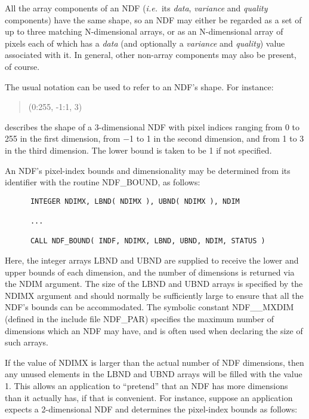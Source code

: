 \documentclass[twoside,11pt]{article}
\newcommand{\htmlref}[2]{#1}
\newcommand{\st}[1]{{\em{#1}}}
\begin{document}
All the array components of an NDF (\st{i.e.}\ its \st{data}, \st{variance\/} and
\st{quality\/} components) have the same shape, so an NDF may either be
regarded as a set of up to three matching N-dimensional arrays, or as an
N-dimensional array of pixels each of which has a \st{data\/} (and optionally
a \st{variance\/} and \st{quality\/}) value associated with it. In general,
other non-array components may also be present, of course.

The usual notation can be used to refer to an NDF's shape.
For instance: 

\small
\begin{quote}
\begin{center}
(0:255, -1:1, 3)
\end{center}
\end{quote}
\normalsize

describes the shape of a 3-dimensional NDF with pixel indices ranging from 0
to 255 in the first dimension, from $-$1 to 1 in the second dimension, and
from 1 to 3 in the third dimension. 
The lower bound is taken to be 1 if not specified.

An NDF's pixel-index bounds and dimensionality may be determined from its 
identifier with the routine \htmlref{NDF\_BOUND}{NDF_BOUND}, as follows:

\small
\begin{verbatim}
      INTEGER NDIMX, LBND( NDIMX ), UBND( NDIMX ), NDIM

      ...

      CALL NDF_BOUND( INDF, NDIMX, LBND, UBND, NDIM, STATUS )
\end{verbatim}
\normalsize

Here, the integer arrays LBND and UBND are supplied to receive the lower and
upper bounds of each dimension, and the number of dimensions is returned via the
NDIM argument. 
The size of the LBND and UBND arrays is specified by the NDIMX argument and
should normally be sufficiently large to ensure that all the NDF's bounds can be
accommodated.
The symbolic constant NDF\_\_MXDIM (defined in the include file NDF\_PAR)
specifies the maximum number of dimensions which an NDF may have, and is
often used when declaring the size of such arrays. 

If the value of NDIMX is larger than the actual number of NDF dimensions,
then any unused elements in the LBND and UBND arrays will be filled with the
value 1. 
This allows an application to ``pretend'' that an NDF has more dimensions than
it actually has, if that is convenient. 
For instance, suppose an application expects a 2-dimensional NDF and determines 
the pixel-index bounds as follows:
\end{document}
